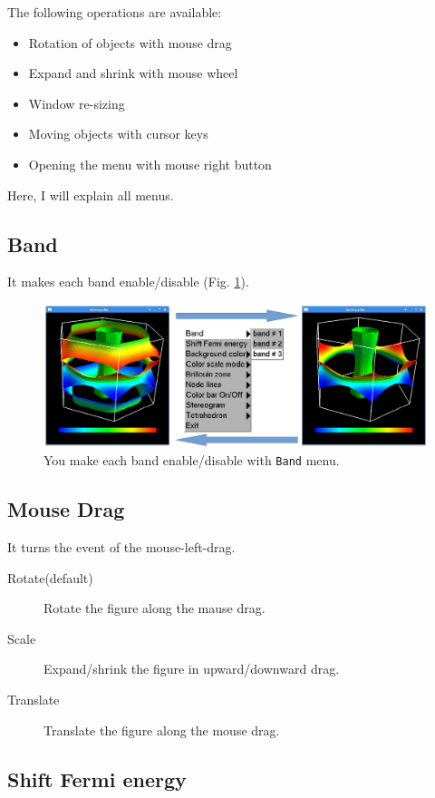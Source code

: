 \documentclass[12pt]{article}
\begin{document}
The following operations are available:
\begin{itemize}
\item Rotation of objects with mouse drag
\item Expand and shrink with mouse wheel
\item Window re-sizing
\item Moving objects with cursor keys
\item Opening the menu with mouse right button
\end{itemize}

Here, I will explain all menus.

\subsection{Band}

It makes each band enable/disable (Fig. \ref{fig_band}).

\begin{figure}[!ht]
  \includegraphics[width=17cm]{figs/band.eps}
  \caption{You make each band enable/disable with \texttt{Band} menu.}
  \label{fig_band}
\end{figure}

\subsection{Mouse Drag}

It turns the event of the mouse-left-drag.

\begin{description}
\item[Rotate(default)] Rotate the figure along the mause drag.
\item[Scale] Expand/shrink the figure in upward/downward drag.
\item[Translate] Translate the figure along the mouse drag.
\end{description}

\subsection{Shift Fermi energy}
\end{document}
